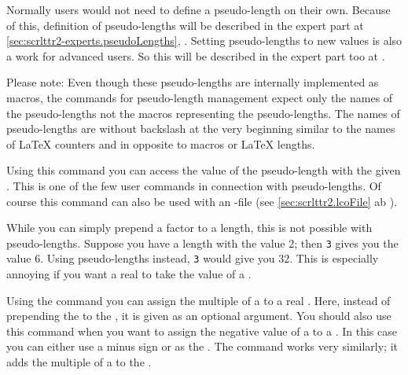 Normally users would not need to define a pseudo-length on their own. Because
of this, definition of pseudo-lengths will be described in the expert part at
\autoref{sec:scrlttr2-experts.pseudoLengths},
. Setting pseudo-lengths to
new values is also a work for advanced users. So this will be described in the
expert part too at .

Please note: Even though these pseudo-lengths are
internally implemented as macros, the commands for pseudo-length management
expect only the names of the pseudo-lengths not the macros representing the
pseudo-lengths. The names of pseudo-lengths are without backslash at the very
beginning similar to the names of \LaTeX{} counters and in opposite to macros
or \LaTeX{} lengths.

\begin{Declaration}
\end{Declaration}
Using this command you can access the value of the pseudo-length with
the given . This is one of the few user commands in
connection with pseudo-lengths. Of course this command can also be
used with an -file (see
\autoref{sec:scrlttr2.lcoFile} ab ).%
%
\EndIndexGroup


\begin{Declaration}
\end{Declaration}
\begin{Explain}%
  While you can simply prepend a factor to a length, this is not
  possible with pseudo-lengths. Suppose you have a length 
  with the value 2; then \texttt{3} gives you the
  value 6. Using pseudo-lengths instead,
  \texttt{3} would give you
  32. This is especially annoying if you want a real
   to take the value of a .
\end{Explain}
Using the command  you can assign the
multiple of a  to a real .  Here,
instead of prepending the  to the ,
it is given as an optional argument. You should also use this command
when you want to assign the negative value of a 
to a . In this case you can either use a minus sign or
 as the . The command
 works very similarly; it adds the multiple
of a  to the .
%
\EndIndexGroup
%
\EndIndexGroup


